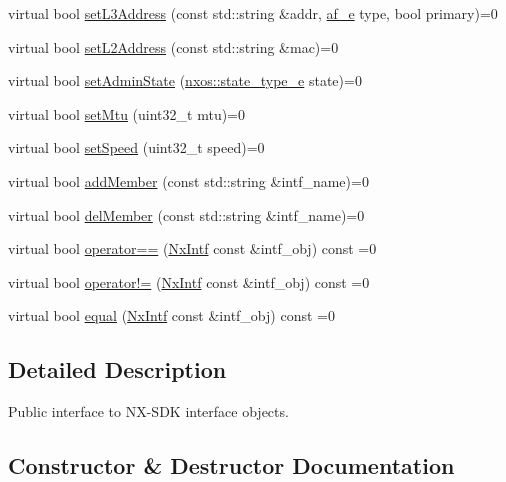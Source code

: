 \begin{DoxyCompactItemize}
virtual bool \mbox{\hyperlink{classnxos_1_1_nx_intf_a9ff78e595e9d16ab1eca675daa98c34e}{set\+L3\+Address}} (const std\+::string \&addr, \mbox{\hyperlink{namespacenxos_a3a667f48b94db10aa398940dc5bf72d7}{af\+\_\+e}} type, bool primary)=0
\item 
virtual bool \mbox{\hyperlink{classnxos_1_1_nx_intf_a90a3cca36e76717085fecf575e815139}{set\+L2\+Address}} (const std\+::string \&mac)=0
\item 
virtual bool \mbox{\hyperlink{classnxos_1_1_nx_intf_a2244d9def0a3538d1f66f8816ad8b545}{set\+Admin\+State}} (\mbox{\hyperlink{namespacenxos_a7c257059d03188765435b36e95dbb764}{nxos\+::state\+\_\+type\+\_\+e}} state)=0
\item 
virtual bool \mbox{\hyperlink{classnxos_1_1_nx_intf_ae2790907b869c62c01567452d66d03f9}{set\+Mtu}} (uint32\+\_\+t mtu)=0
\item 
virtual bool \mbox{\hyperlink{classnxos_1_1_nx_intf_ad42e229fc4c3aa9111b3a8805d55588c}{set\+Speed}} (uint32\+\_\+t speed)=0
\item 
virtual bool \mbox{\hyperlink{classnxos_1_1_nx_intf_a499756ef5447cd4037d095a444aefc99}{add\+Member}} (const std\+::string \&intf\+\_\+name)=0
\item 
virtual bool \mbox{\hyperlink{classnxos_1_1_nx_intf_a6886f3b84e843069a5fdf5434b061f80}{del\+Member}} (const std\+::string \&intf\+\_\+name)=0
\item 
virtual bool \mbox{\hyperlink{classnxos_1_1_nx_intf_a132f11f6cf7b6d93af1c9e565dc853c5}{operator==}} (\mbox{\hyperlink{classnxos_1_1_nx_intf}{Nx\+Intf}} const \&intf\+\_\+obj) const =0
\item 
virtual bool \mbox{\hyperlink{classnxos_1_1_nx_intf_aa0b5180978bbdcb3da2f18ed9bef089c}{operator!=}} (\mbox{\hyperlink{classnxos_1_1_nx_intf}{Nx\+Intf}} const \&intf\+\_\+obj) const =0
\item 
virtual bool \mbox{\hyperlink{classnxos_1_1_nx_intf_a3121854504b3d9828f75e3d47f50d7f8}{equal}} (\mbox{\hyperlink{classnxos_1_1_nx_intf}{Nx\+Intf}} const \&intf\+\_\+obj) const =0
\end{DoxyCompactItemize}


\subsection{Detailed Description}
Public interface to N\+X-\/\+S\+DK interface objects. 

\subsection{Constructor \& Destructor Documentation}
\mbox{\label{classnxos_1_1_nx_intf_a10fbaca5467637b238b8a4f1f1aa75e0}} 
